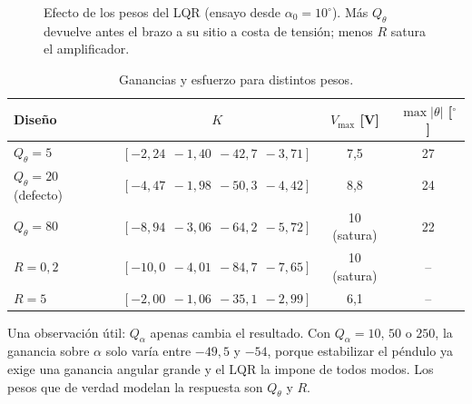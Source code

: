 \begin{figure}[H]
\centering
{}
\caption{Efecto de los pesos del LQR (ensayo desde $\alpha_0=10^\circ$). Más $Q_\theta$ devuelve antes el brazo a su sitio a costa de tensión; menos $R$ satura el amplificador.}
\label{fig:pesos}
\end{figure}

\begin{table}[H]
\centering\small
\begin{tabular}{@{}lccc@{}}
\toprule
Diseño & $K$ & $V_{\max}$ [V] & $\max|\theta|$ [$^\circ$]\\
\midrule
$Q_\theta=5$ & $[-2{,}24\ \ -1{,}40\ \ -42{,}7\ \ -3{,}71]$ & 7,5 & 27\\
$Q_\theta=20$ (defecto) & $[-4{,}47\ \ -1{,}98\ \ -50{,}3\ \ -4{,}42]$ & 8,8 & 24\\
$Q_\theta=80$ & $[-8{,}94\ \ -3{,}06\ \ -64{,}2\ \ -5{,}72]$ & 10 (satura) & 22\\
$R=0{,}2$ & $[-10{,}0\ \ -4{,}01\ \ -84{,}7\ \ -7{,}65]$ & 10 (satura) & --\\
$R=5$ & $[-2{,}00\ \ -1{,}06\ \ -35{,}1\ \ -2{,}99]$ & 6,1 & --\\
\bottomrule
\end{tabular}
\caption{Ganancias y esfuerzo para distintos pesos.}
\end{table}

Una observación útil: $Q_\alpha$ apenas cambia el resultado. Con $Q_\alpha=10$, $50$ o $250$, la ganancia sobre $\alpha$ solo varía entre $-49{,}5$ y $-54$, porque estabilizar el péndulo ya exige una ganancia angular grande y el LQR la impone de todos modos. Los pesos que de verdad modelan la respuesta son $Q_\theta$ y $R$.

